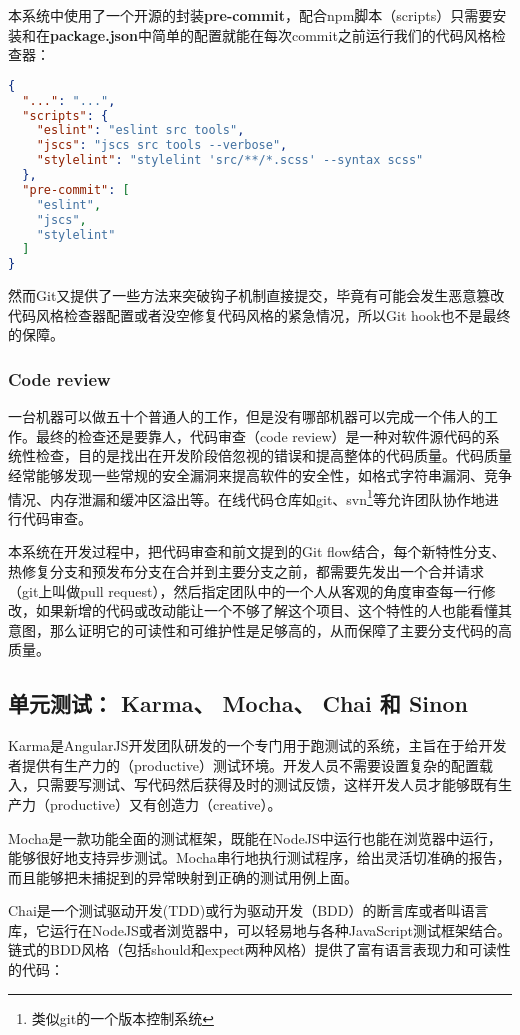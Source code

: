 本系统中使用了一个开源的封装\textbf{pre-commit}，配合npm脚本（scripts）只需要安装和在\textbf{package.json}中简单的配置就能在每次commit之前运行我们的代码风格检查器：
\begin{lstlisting}[language={JSON}, caption={package.json中的pre-commit设置部分}]
{
  "...": "...",
  "scripts": {
    "eslint": "eslint src tools",
    "jscs": "jscs src tools --verbose",
    "stylelint": "stylelint 'src/**/*.scss' --syntax scss"
  },
  "pre-commit": [
    "eslint",
    "jscs",
    "stylelint"
  ]
}
\end{lstlisting}

然而Git又提供了一些方法来突破钩子机制直接提交，毕竟有可能会发生恶意篡改代码风格检查器配置或者没空修复代码风格的紧急情况，所以Git hook也不是最终的保障。
\subsubsection{Code review}
一台机器可以做五十个普通人的工作，但是没有哪部机器可以完成一个伟人的工作\supercite{hubbard2015one}。最终的检查还是要靠人，代码审查（code review）是一种对软件源代码的系统性检查，目的是找出在开发阶段倍忽视的错误和提高整体的代码质量。代码质量经常能够发现一些常规的安全漏洞来提高软件的安全性，如格式字符串漏洞、竞争情况、内存泄漏和缓冲区溢出等。在线代码仓库如git、svn\footnote{类似git的一个版本控制系统}等允许团队协作地进行代码审查。

本系统在开发过程中，把代码审查和前文提到的Git flow结合，每个新特性分支、热修复分支和预发布分支在合并到主要分支之前，都需要先发出一个合并请求（git上叫做pull request），然后指定团队中的一个人从客观的角度审查每一行修改，如果新增的代码或改动能让一个不够了解这个项目、这个特性的人也能看懂其意图，那么证明它的可读性和可维护性是足够高的，从而保障了主要分支代码的高质量。
\subsection{单元测试： Karma、 Mocha、 Chai 和 Sinon}
Karma是AngularJS开发团队研发的一个专门用于跑测试的系统，主旨在于给开发者提供有生产力的（productive）测试环境。开发人员不需要设置复杂的配置载入，只需要写测试、写代码然后获得及时的测试反馈，这样开发人员才能够既有生产力（productive）又有创造力（creative）。

Mocha是一款功能全面的测试框架，既能在NodeJS中运行也能在浏览器中运行，能够很好地支持异步测试。Mocha串行地执行测试程序，给出灵活切准确的报告，而且能够把未捕捉到的异常映射到正确的测试用例上面。

Chai是一个测试驱动开发(TDD)或行为驱动开发（BDD）的断言库或者叫语言库，它运行在NodeJS或者浏览器中，可以轻易地与各种JavaScript测试框架结合。链式的BDD风格（包括should和expect两种风格）提供了富有语言表现力和可读性的代码：

